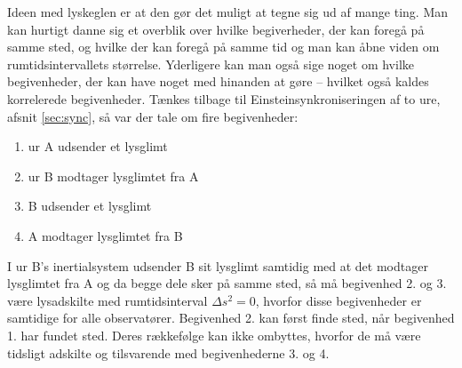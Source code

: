 Ideen med lyskeglen er at den gør det muligt at tegne sig ud af mange ting. Man kan hurtigt danne sig et overblik over hvilke begiverheder, der kan foregå på samme sted, og hvilke der kan foregå på samme tid og man kan åbne viden om rumtidsintervallets størrelse. Yderligere kan man også sige noget om hvilke begivenheder, der kan have noget med hinanden at gøre -- hvilket også kaldes korrelerede begivenheder. Tænkes tilbage til Einsteinsynkroniseringen af to ure, afsnit \ref{sec:sync}, så var der tale om fire begivenheder:
\begin{enumerate}
    \item ur A udsender et lysglimt
    \item ur B modtager lysglimtet fra A
    \item B udsender et lysglimt
    \item A modtager lysglimtet fra B
\end{enumerate}
I ur B's inertialsystem udsender B sit lysglimt samtidig med at det modtager lysglimtet fra A og da begge dele sker på samme sted, så må begivenhed 2. og 3. være lysadskilte med rumtidsinterval $\Delta s^2 = 0$, hvorfor disse begivenheder er samtidige for alle observatører. Begivenhed 2. kan først finde sted, når begivenhed 1. har fundet sted. Deres rækkefølge kan ikke ombyttes, hvorfor de må være tidsligt adskilte og tilsvarende med begivenhederne 3. og 4.